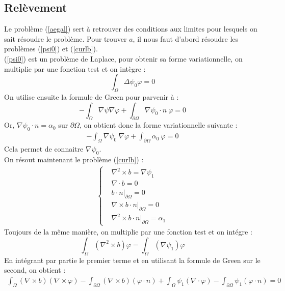\subsection{Relèvement}
\label{relev}

Le problème (\ref{aegal}) sert à retrouver des conditions aux limites pour lesquels on sait résoudre le problème. Pour trouver $a$, il nous faut d'abord résoudre les problèmes (\ref{psi0}) et (\ref{curlb}).\\

(\ref{psi0}) est un problème de Laplace, pour obtenir sa forme variationnelle, on multiplie par une fonction test et on intègre :
\[
\int_\Omega \Delta\psi_0 \varphi = 0
\]
On utilise ensuite la formule de Green pour parvenir à :
\[
-\int_\Omega \nabla\psi\nabla\varphi + \int_{\partial\Omega} \nabla\psi_0\cdot n\ \varphi = 0
\]
Or, $\nabla\psi_0\cdot n = \alpha_0$ sur $\partial\Omega$, on obtient donc la forme variationnelle suivante :
\begin{eqnarray}
\label{fvpsi}
-\int_\Omega \nabla\psi_0\ \nabla\varphi + \int_{\partial\Omega} \alpha_0\ \varphi = 0
\end{eqnarray}
Cela permet de connaitre $\nabla\psi_0$.\\

On résout maintenant le problème (\ref{curlb}) :
\begin{eqnarray*}
\left\{
\begin{aligned}
&\nabla^2\times b = \nabla\psi_1\\
&\nabla\cdot b = 0\\
&b\cdot n\big\rvert_{\partial\Omega} = 0\\
&\nabla\times b\cdot n\big\rvert_{\partial\Omega} = 0\\
&\nabla^2\times b\cdot n\big\rvert_{\partial\Omega} = \alpha_1
\end{aligned}
\right.
\end{eqnarray*}
Toujours de la même manière, on multiplie par une fonction test et on intégre :
\[
\int_\Omega (\nabla^2\times b) \varphi = \int_\Omega (\nabla\psi_1)\varphi
\]
En intégrant par partie le premier terme et en utilisant la formule de Green sur le second, on obtient :
\begin{eqnarray}
\label{fvrelev}
\int_\Omega (\nabla\times b)(\nabla\times\varphi) - \int_{\partial\Omega} (\nabla\times b)(\varphi\cdot n) +\int_\Omega \psi_1(\nabla\cdot\varphi) - \int_{\partial\Omega} \psi_1(\varphi\cdot n) = 0
\end{eqnarray}

